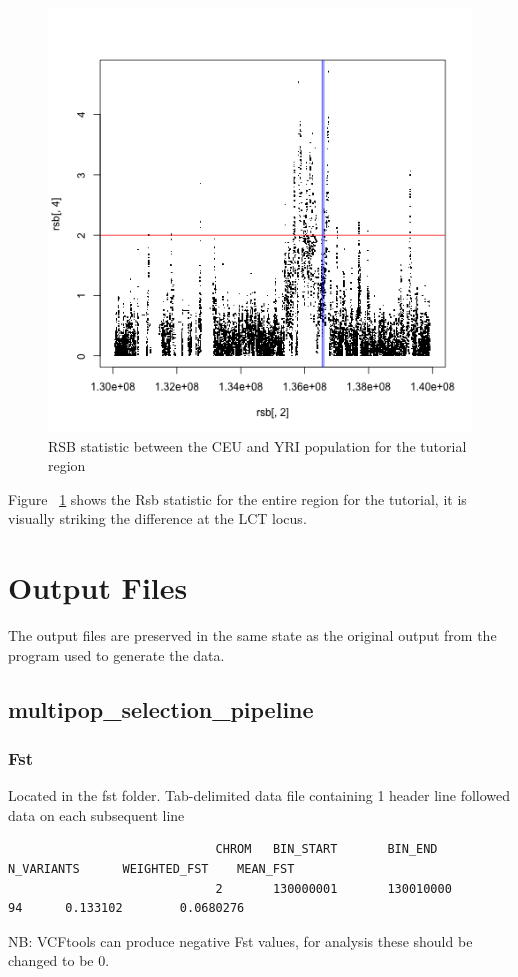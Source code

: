 \documentclass[a4paper,10pt]{article}
\begin{document}
                             \begin{figure}
                             \centering
                             \includegraphics{pictures/RSBCEUYRI.png}
                             \caption{RSB statistic between the CEU and YRI population for the tutorial region} 
                             \label{fig:rsb}
                             \end{figure}
                             Figure ~\ref{fig:rsb} shows the Rsb statistic for the entire region for the tutorial, it is visually striking the difference at the LCT locus.

                             \pagebreak
                             \section{Output Files}
                             The output files are preserved in the same state as the original output from the program used to generate the data.
                             \subsection{multipop\_selection\_pipeline}
                             \subsubsection{Fst}
                             Located in the fst folder. Tab-delimited data file containing 1 header line followed data on each subsequent line\\
                             \begin{verbatim}
                             CHROM   BIN_START       BIN_END N_VARIANTS      WEIGHTED_FST    MEAN_FST  
                             2       130000001       130010000       94      0.133102        0.0680276 
                             \end{verbatim}
                             NB: VCFtools can produce negative Fst values, for analysis these should be changed to be 0.
\end{document}
